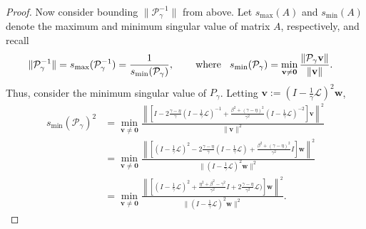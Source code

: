 \documentclass[a4paper,10pt]{article}
\begin{document}
\begin{proof}
Now consider bounding $\|\mathcal{P}_\gamma^{-1}\|$ from above. Let $s_{\max}(A)$
and $s_{\min}(A)$ denote the maximum and minimum singular value of matrix $A$,
respectively, and recall
%
\begin{align*}
\|\mathcal{P}_\gamma^{-1}\| = s_{\max}(\mathcal{P}_\gamma^{-1})
	& = \frac{1}{s_{\min}(\mathcal{P}_\gamma)}, \hspace{5ex}\textnormal{where}\hspace{2ex}
s_{\min}(\mathcal{P}_\gamma) =
	\min_{\mathbf{v}\neq\mathbf{0}} \frac{\|\mathcal{P}_\gamma\mathbf{v}\|}{\|\mathbf{v}\|}.
\end{align*}
%
Thus, consider the minimum singular value of $P_\gamma$. Letting $\mathbf{v} :=
(I - \tfrac{1}{\gamma}\mathcal{L})^{2}\mathbf{w}$,
%
\begin{align}\nonumber
s_{\min}(\mathcal{P}_\gamma)^2 & = \min_{\mathbf{v}\neq\mathbf{0}}
	\frac{\left\| \left[I - 2\frac{\gamma-\eta}{\gamma}(I - \tfrac{1}{\gamma}
		\mathcal{L})^{-1} + \frac{\beta^2 + (\gamma-\eta)^2}{\gamma^2}
		(I - \tfrac{1}{\gamma}\mathcal{L})^{-2}\right]\mathbf{v} \right\|^2}
	{\|\mathbf{v}\|^2} \\
& = \min_{\mathbf{v}\neq\mathbf{0}}
	\frac{\left\| \left[(I - \tfrac{1}{\gamma}\mathcal{L})^{2} - 2\frac{\gamma-\eta}{\gamma}
		(I - \tfrac{1}{\gamma} \mathcal{L}) + \frac{\beta^2 + (\gamma-\eta)^2}{\gamma^2} I
		\right]\mathbf{w} \right\|^2}
	{\|(I - \tfrac{1}{\gamma}\mathcal{L})^{2}\mathbf{w}\|^2} \nonumber\\
& = \min_{\mathbf{v}\neq\mathbf{0}}
	\frac{\left\| \left[(I - \tfrac{1}{\gamma}\mathcal{L})^{2} + 
		\tfrac{\eta^2+\beta^2-\gamma^2}{\gamma^2} I + 2\frac{\gamma-\eta}{\gamma^2}
		\mathcal{L}) \right]\mathbf{w} \right\|^2}
	{\|(I - \tfrac{1}{\gamma}\mathcal{L})^{2}\mathbf{w}\|^2}.\label{eq:smin0}
\end{align}
%


\end{proof}
\end{document}
